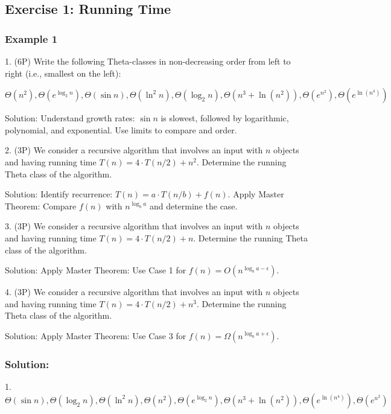 \newpage


\subsection{Exercise 1: Running Time}

\subsubsection*{Example 1}
1. (6P) Write the following Theta-classes in non-decreasing order from left to right (i.e., smallest on the left):

\(\Theta(n^2), \Theta(e^{\log_2 n}), \Theta(\sin n), \Theta(\ln^2 n), \Theta(\log_2 n), \Theta(n^3 + \ln(n^2)), \Theta(e^{n^2}), \Theta(e^{\ln(n^4)})\)

Solution: Understand growth rates: \(\sin n\) is slowest, followed by logarithmic, polynomial, and exponential. Use limits to compare and order.

2. (3P) We consider a recursive algorithm that involves an input with \(n\) objects and having running time \(T(n) = 4 \cdot T(n/2) + n^2\). Determine the running Theta class of the algorithm.

Solution: Identify recurrence: \(T(n) = a \cdot T(n/b) + f(n)\). Apply Master Theorem: Compare \(f(n)\) with \(n^{\log_b a}\) and determine the case.

3. (3P) We consider a recursive algorithm that involves an input with \(n\) objects and having running time \(T(n) = 4 \cdot T(n/2) + n\). Determine the running Theta class of the algorithm.

Solution: Apply Master Theorem: Use Case 1 for \(f(n) = O(n^{\log_b a - \epsilon})\).

4. (3P) We consider a recursive algorithm that involves an input with \(n\) objects and having running time \(T(n) = 4 \cdot T(n/2) + n^3\). Determine the running Theta class of the algorithm.

Solution: Apply Master Theorem: Use Case 3 for \(f(n) = \Omega(n^{\log_b a + \epsilon})\).

\subsubsection*{Solution:}
1. \(\Theta(\sin n), \Theta(\log_2 n), \Theta(\ln^2 n), \Theta(n^2), \Theta(e^{\log_2 n}), \Theta(n^3 + \ln(n^2)), \Theta(e^{\ln(n^4)}), \Theta(e^{n^2})\)

